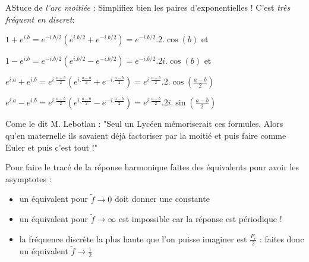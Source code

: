  
 \begin{remarque}
 AStuce de \emph{l'arc moitiée} :
 Simplifiez bien les paires d'exponentielles ! C'est \emph{très fréquent en discret}:  

 $1 + e^{i.b} = e^{-i.b/2} (e^{i.b/2} + e^{-i.b/2}) = e^{-i.b/2}.2.\cos(b)$ et  

 $1 - e^{i.b} = e^{-i.b/2} (e^{i.b/2} - e^{-i.b/2}) = e^{-i.b/2}.2i.\cos(b)$ et  

 $e^{i.a} + e^{i.b} = e^{i.\frac{a+b}{2}} (e^{i.\frac{a-b}{2}} + e^{-i.\frac{a-b}{2}}) = e^{i.\frac{a+b}{2}}.2.\cos\left(\frac{a-b}{2}\right)$  

 $e^{i.a} - e^{i.b} = e^{i.\frac{a+b}{2}} (e^{i.\frac{a-b}{2}} - e^{-i.\frac{a-b}{2}}) = e^{i.\frac{a+b}{2}}.2i.\sin\left(\frac{a-b}{2}\right)$
 
 Come le dit M. Lebotlan : "Seul un Lycéen mémoriserait ces formules. 
  Alors qu'en maternelle ils savaient déjà factoriser par la moitié et puis faire comme Euler et puis c'est tout !"
\end{remarque}
Pour faire le tracé de la réponse harmonique faites des équivalents pour avoir les asymptotes :
\begin{itemize}
\item  un équivalent pour $\tilde{f} \to 0$ doit donner une constante
\item un équivalent pour $\tilde{f} \to \infty$ est impossible car la réponse est périodique ! 
\item la fréquence discrète la plus haute que l'on puisse imaginer est $\frac{F_e}{2}$ : faites donc un équivalent $\tilde{f} \to \frac{1}{2}$

\end{itemize}
  
   
